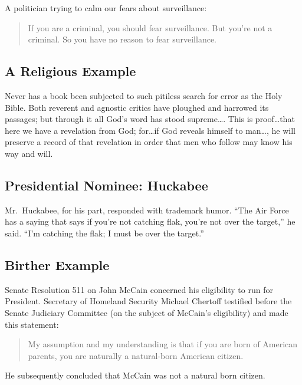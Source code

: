 \documentclass[]{article}
\begin{document}
A politician trying to calm our fears about surveillance:

\begin{quote}
If you are a criminal, you should fear surveillance. But you're not a
criminal. So you have no reason to fear surveillance.
\end{quote}

\subsection{A Religious Example}\label{a-religious-example}

Never has a book been subjected to such pitiless search for error as the
Holy Bible. Both reverent and agnostic critics have ploughed and
harrowed its passages; but through it all God's word has stood
supreme\ldots{}. This is proof\ldots{}that here we have a revelation
from God; for\ldots{}if God reveals himself to man\ldots{}, he will
preserve a record of that revelation in order that men who follow may
know his way and will.

\subsection{Presidential Nominee:
Huckabee}\label{presidential-nominee-huckabee}

Mr.~Huckabee, for his part, responded with trademark humor. ``The Air
Force has a saying that says if you're not catching flak, you're not
over the target,'' he said. ``I'm catching the flak; I must be over the
target.''

\subsection{Birther Example}\label{birther-example}

Senate Resolution 511 on John McCain concerned his eligibility to run
for President. Secretary of Homeland Security Michael Chertoff testified
before the Senate Judiciary Committee (on the subject of McCain's
eligibility) and made this statement:

\begin{quote}
My assumption and my understanding is that if you are born of American
parents, you are naturally a natural-born American citizen.
\end{quote}

He subsequently concluded that McCain was not a natural born citizen.
\end{document}
